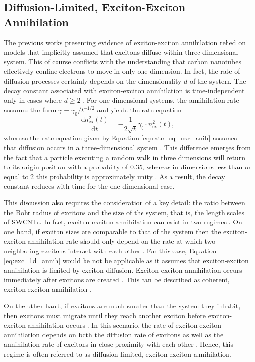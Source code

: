 \subsection{Diffusion-Limited, Exciton-Exciton Annihilation}
The previous works presenting evidence of exciton-exciton annihilation relied on models that implicitly assumed that excitons diffuse within three-dimensional system. This of course conflicts with the understanding that carbon nanotubes effectively confine electrons to move in only one dimension. In fact, the rate of diffusion processes certainly depends on the dimensionality $d$ of the system. The decay constant associated with exciton-exciton annihilation is time-independent only in cases where $d \geq 2$ \cite{valkunas2006exciton}. For one-dimensional systems, the annihilation rate assumes the form $\gamma = \gamma_0 / t^{-1/2}$ and yields the rate equation
\begin{equation}
		\frac{\mathrm{d} n_\text{ex}^2(t)}{\mathrm{d}t} = -\frac{1}{2 \sqrt{t}}  \gamma_0 \cdot n_\text{ex}^2(t),
		\label{eq:exc_1d_annih}
\end{equation}
whereas the rate equation given by Equation \eqref{eq:rate_eq_exc_anih} assumes that diffusion occurs in a three-dimensional system \cite{suna1970kinematics}. This difference emerges from the fact that a particle executing a random walk in three dimensions will return to its origin position with a probabilty of 0.35, whereas in dimensions less than or equal to 2 this probability is approximately unity \cite{suna1970kinematics}. As a result, the decay constant reduces with time for the one-dimensional case.

This discussion also requires the consideration of a key detail: the ratio between the Bohr radius of excitons and the size of the system, that is, the length scales of SWCNTs. In fact, exciton-exciton annihilation can exist in two regimes \cite{valkunas2006exciton}. On one hand, if exciton sizes are comparable to that of the system then the exciton-exciton annihilation rate should only depend on the rate at which two neighboring excitons interact with each other \cite{valkunas2006exciton}. For this case, Equation \eqref{eq:exc_1d_annih} would be not be applicable as it assumes that exciton-exciton annihilation is limited by exciton diffusion. Exciton-exciton annihilation occurs immediately after excitons are created \cite{valkunas2006exciton}. This can be described as coherent, exciton-exciton annihilation \cite{valkunas2006exciton}.

On the other hand, if excitons are much smaller than the system they inhabit, then excitons must migrate until they reach another exciton before exciton-exciton annihilation occurs \cite{valkunas2006exciton}. In this scenario, the rate of exciton-exciton annihilation depends on both the diffusion rate of excitons as well as the annihilation rate of excitons in close proximity with each other \cite{valkunas2006exciton}. Hence, this regime is often referred to as diffusion-limited, exciton-exciton annihilation.


